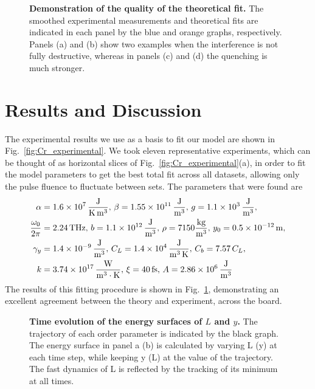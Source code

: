 \begin{figure}
\caption{\label{fig:Cr_theoretical_fit} {\bf Demonstration of the quality of the theoretical fit.} The smoothed experimental measurements and theoretical fits are indicated in each panel by the blue and orange graphs, respectively. Panels (a) and (b) show two examples when the interference is not fully destructive, whereas in panels (c) and (d) the quenching is much stronger.}
\end{figure}
\section{Results and Discussion \label{sec:Cr_results}}
The experimental results we use as a basis to fit our model are shown in Fig.~\ref{fig:Cr_experimental}.
We took eleven representative experiments, which can be thought of as horizontal slices of Fig.~\ref{fig:Cr_experimental}(a), in order to fit the model parameters to get the best total fit across all datasets, allowing only the pulse fluence to fluctuate between sets.
The parameters that were found are
\begin{align}
	\alpha &= \SI{1.6e7} {\rm \frac{J}{K\, m^3}},\, \beta = \SI{1.55e11} {\rm \frac{J}{m^3}},\, g = \SI{1.1e3}{\rm \frac{J}{m^3}}, \\
	\frac{\omega_0}{2\pi} &= 2.24\, {\rm THz},\, b = \SI{1.1e12} {\rm \frac{J}{m^3}},\, \rho = 7150 {\rm \frac{kg}{m^3}},\, y_0 = \SI{0.5e-12} {\rm m},\\
	\gamma_y &= \SI{1.4e-9}{\rm \frac{J}{m^3}}, \, C_L = \SI{1.4e4}{\rm \frac{J}{m^3\,K}},\, C_b = 7.57\,C_L,\\
	k &= \SI{3.74e17} {\rm \frac{W}{m^3\cdot K}},\, \xi = 40\,{\rm fs},\,A = \SI{2.86e6}{\rm \frac{J}{m^3}}
\end{align}
The results of this fitting procedure is shown in Fig.~\ref{fig:Cr_theoretical_fit}, demonstrating an excellent agreement between the theory and experiment, across the board.
\begin{figure}
	\centering
	\caption{\label{fig:Cr_energy_surfaces}{\bf Time evolution of the energy surfaces of $L$ and $y$.} The trajectory of each order parameter is indicated by the black graph. The energy surface in panel a (b) is calculated by varying L (y) at each time step, while keeping y (L) at the value of the trajectory. The fast dynamics of L is reflected by the tracking of its minimum at all times.}
\end{figure}
